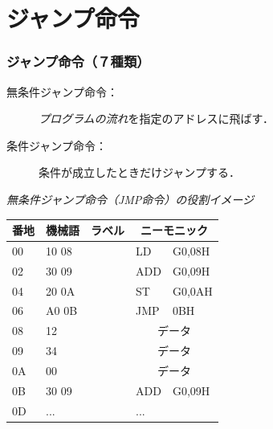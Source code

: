 \documentclass{beamer}                 %
\begin{document}
\section{ジャンプ命令}
\begin{frame}
  \frametitle{ジャンプ命令（７種類）}
  \begin{description}
  \item[無条件ジャンプ命令：]\emph{プログラムの流れ}を指定のアドレスに飛ばす．
  \item[条件ジャンプ命令：]条件が成立したときだけジャンプする．
  \end{description}
  \vfill

  \emph{無条件ジャンプ命令（JMP命令）の役割イメージ}\\
  {\ttfamily\small\begin{center}
    \begin{tabular}{|l|l|l|l l|} \hline
      番地 & 機械語 & ラベル & \multicolumn{2}{|c|}{ニーモニック} \\
      \hline
      00 & 10 08 &             & LD   & G0,08H                \\
      02 & 30 09 &             & ADD  & G0,09H                \\
      04 & 20 0A &             & ST   & G0,0AH                \\
      06 & A0 0B &             & JMP  & 0BH                   \\
      08 & 12    &             & \multicolumn{2}{|c|}{データ} \\
      09 & 34    &             & \multicolumn{2}{|c|}{データ} \\
      0A & 00    &             & \multicolumn{2}{|c|}{データ} \\
      0B & 30 09 &             & ADD  & G0,09H                \\
      0D & ...   &             & ...  &                       \\
      \hline
    \end{tabular}
    \end{center}}
  \vfill
\end{frame}
\end{document}
